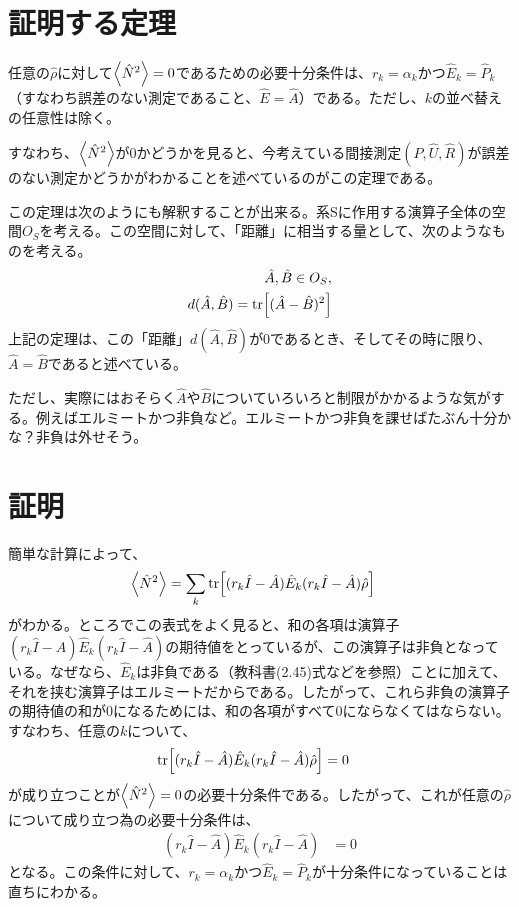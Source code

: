 \documentclass[uplatex,dvipdfmx, a4j]{jsarticle}
\newcommand{\ope}[1]{\hat{#1}}
\begin{document}
\section{証明する定理}
任意の$\ope{\rho}$に対して$\expval{\ope{N}^2}=0$であるための必要十分条件は、$r_k = \alpha_k$かつ$\ope{E}_k = \ope{P}_k$（すなわち誤差のない測定であること、$\ope{E}=\ope{A}$）である。ただし、$k$の並べ替えの任意性は除く。

すなわち、$\expval{\ope{N}^2}$が0かどうかを見ると、今考えている間接測定$(P, \ope{U}, \ope{R})$が誤差のない測定かどうかがわかることを述べているのがこの定理である。

この定理は次のようにも解釈することが出来る。系Sに作用する演算子全体の空間$O_S$を考える。この空間に対して、「距離」に相当する量として、次のようなものを考える。
\begin{align}
	\ope{A}, \ope{B} \in O_S, \\
	d(\ope{A}, \ope{B}) = \tr[(\ope{A}-\ope{B})^2]
\end{align}
上記の定理は、この「距離」$d(\ope{A},\ope{B})$が0であるとき、そしてその時に限り、$\ope{A}=\ope{B}$であると述べている。

ただし、実際にはおそらく$\ope{A}$や$\ope{B}$についていろいろと制限がかかるような気がする。例えばエルミートかつ非負など。エルミートかつ非負を課せばたぶん十分かな？非負は外せそう。

\section{証明}
簡単な計算によって、
\begin{align}
	\expval{\ope{N}^2} &= \sum_k \tr[(r_k\ope{I}-\ope{A})\ope{E}_k(r_k\ope{I}-\ope{A})\ope{\rho}]
\end{align}
がわかる。ところでこの表式をよく見ると、和の各項は演算子$(r_k\ope{I}-\ope{A})\ope{E}_k(r_k\ope{I}-\ope{A})$の期待値をとっているが、この演算子は非負となっている。なぜなら、$\ope{E}_k$は非負である（教科書(2.45)式などを参照）ことに加えて、それを挟む演算子はエルミートだからである。したがって、これら非負の演算子の期待値の和が0になるためには、和の各項がすべて0にならなくてはならない。すなわち、任意の$k$について、
\begin{align}
	\tr[(r_k\ope{I}-\ope{A})\ope{E}_k(r_k\ope{I}-\ope{A})\ope{\rho}] &= 0
\end{align}
が成り立つことが$\expval{\ope{N}^2}=0$の必要十分条件である。したがって、これが任意の$\ope{\rho}$について成り立つ為の必要十分条件は、
\begin{align}
	(r_k\ope{I}-\ope{A})\ope{E}_k(r_k\ope{I}-\ope{A}) &= 0 \label{eq:condition}
\end{align}
となる。この条件に対して、$r_k = \alpha_k$かつ$\ope{E}_k = \ope{P}_k$が十分条件になっていることは直ちにわかる。
\end{document}
